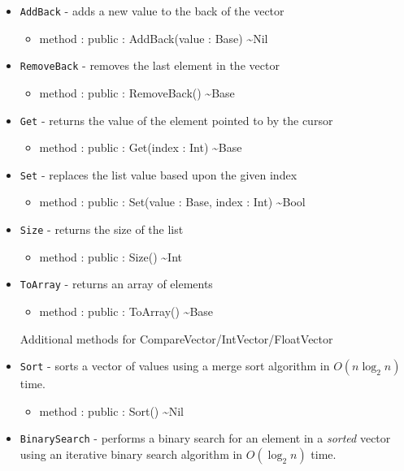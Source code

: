 \documentclass[11pt]{article}
\begin{document}
\begin{itemize}
\item \texttt{AddBack} - adds a new value to the back of the vector
  \begin{itemize}
  \item method : public : AddBack(value : Base) \textasciitilde Nil
  \end{itemize}
\item \texttt{RemoveBack} - removes the last element in the vector
  \begin{itemize}
  \item method : public : RemoveBack() \textasciitilde Base
  \end{itemize}
\item \texttt{Get} - returns the value of the element pointed to by
  the cursor
  \begin{itemize}
  \item method : public : Get(index : Int) \textasciitilde Base
  \end{itemize}
\item \texttt{Set} - replaces the list value based upon the given
  index
  \begin{itemize}
  \item method : public : Set(value : Base, index : Int) \textasciitilde Bool
  \end{itemize}
\item \texttt{Size} - returns the size of the list
  \begin{itemize}
  \item method : public : Size() \textasciitilde Int
  \end{itemize}
\item \texttt{ToArray} - returns an array of elements
  \begin{itemize}
  \item method : public : ToArray() \textasciitilde Base
  \end{itemize}
  Additional methods for CompareVector/IntVector/FloatVector
\item \texttt{Sort} - sorts a vector of values using a merge sort
  algorithm in $O(n \log_2 n)$ time.
  \begin{itemize}
  \item method : public : Sort() \textasciitilde Nil
  \end{itemize}
\item \texttt{BinarySearch} - performs a binary search for an element
  in a \emph{sorted} vector using an iterative binary search algorithm
  in $O(\log_2 n)$ time.
  \begin{itemize}

\end{itemize}
\end{itemize}
\end{document}
